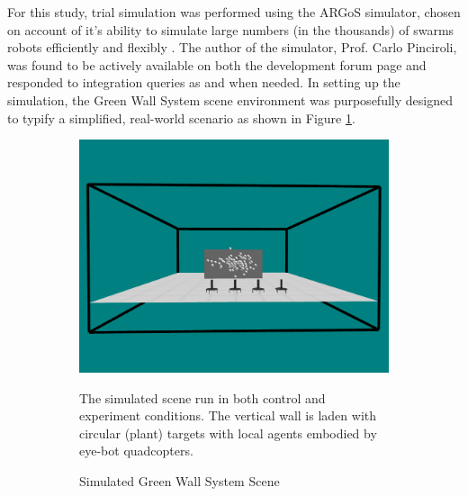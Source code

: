 \documentclass{report}
\begin{document}
For this study, trial simulation was performed using the ARGoS simulator, chosen on account of it's ability to simulate large numbers (in the thousands) of swarms robots efficiently and flexibly \cite{Pinciroli2014}. The author of the simulator, Prof. Carlo Pinciroli, was found to be actively available on both the development forum page and responded to integration queries as and when needed. In setting up the simulation, the Green Wall System scene environment was purposefully designed to typify a simplified, real-world scenario as shown in Figure \ref{fig:sim_orig_scene}.

\begin{figure}
	\begin{subfigure}[b]{0.6\textwidth}
		\centering
		\includegraphics[width=\textwidth]{images/vertical_wall_garden_scene}
		\caption{Simulated Green Wall System Scene}
		\label{fig:sim_orig_scene}
		{The simulated scene run in both control and experiment conditions. The vertical wall is laden with circular (plant) targets with local agents embodied by eye-bot quadcopters}.
	\end{subfigure}
	~
	\begin{subfigure}[b]{0.4\textwidth}
		\centering

\end{subfigure}
\end{figure}
\end{document}

